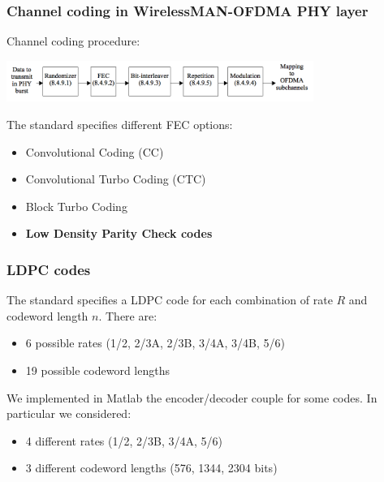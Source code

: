 \documentclass[]{beamer}
\begin{document}
\begin{frame}
\transwipe[direction=0]
\frametitle{Channel coding in WirelessMAN-OFDMA PHY layer}
Channel coding procedure:

\begin{center}
\includegraphics[width=10cm]{figure1/procedure}
\end{center}

The standard specifies different FEC options:
\begin{itemize}
\item Convolutional Coding (CC)
\item Convolutional Turbo Coding (CTC)
\item Block Turbo Coding 
\item \textbf{Low Density Parity Check codes}
\end{itemize}

\end{frame}

\begin{frame}
\transwipe[direction=0]
\frametitle{LDPC codes}
The standard specifies a LDPC code for each combination of rate $R$ and codeword length $n$. There are:
\begin{itemize}
\item 6 possible rates (1/2, 2/3A, 2/3B, 3/4A, 3/4B, 5/6)
\item 19 possible codeword lengths
\end{itemize}

\vspace{0.5cm}

We implemented in Matlab the encoder/decoder couple for some codes. In particular we considered:
\begin{itemize}
\item 4 different rates (1/2, 2/3B, 3/4A, 5/6)
\item 3 different codeword lengths (576, 1344, 2304 bits)
\end{itemize}


\end{frame}
\end{document}

